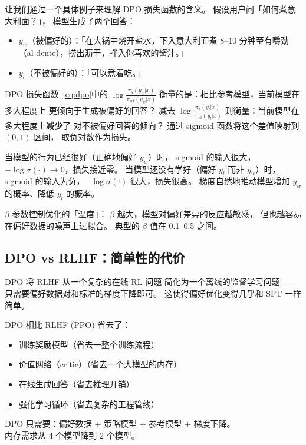 让我们通过一个具体例子来理解 DPO 损失函数的含义。
假设用户问「如何煮意大利面？」，
模型生成了两个回答：
\begin{itemize}[noitemsep]
  \item $y_w$（被偏好的）：「在大锅中烧开盐水，下入意大利面煮 8--10 分钟至有嚼劲（al dente），捞出沥干，拌入你喜欢的酱汁。」
  \item $y_l$（不被偏好的）：「可以煮着吃。」
\end{itemize}

DPO 损失函数~\eqref{eq:dpo}中的
$\log \frac{\pi_\theta(y_w|x)}{\pi_{\mathrm{ref}}(y_w|x)}$
衡量的是：相比参考模型，当前模型在多大程度上
更倾向于生成被偏好的回答？
减去 $\log \frac{\pi_\theta(y_l|x)}{\pi_{\mathrm{ref}}(y_l|x)}$
则衡量：当前模型在多大程度上\textbf{减少}了
对不被偏好回答的倾向？
通过 sigmoid 函数将这个差值映射到 $(0, 1)$ 区间，
取负对数作为损失。

当模型的行为已经很好（正确地偏好 $y_w$）时，
sigmoid 的输入很大，$-\log \sigma(\cdot) \to 0$，损失接近零。
当模型还没有学好（偏好 $y_l$ 而非 $y_w$）时，
sigmoid 的输入为负，$-\log \sigma(\cdot)$ 很大，损失很高。
梯度自然地推动模型增加 $y_w$ 的概率、降低 $y_l$ 的概率。

$\beta$ 参数控制优化的「温度」：
$\beta$ 越大，模型对偏好差异的反应越敏感，
但也越容易在偏好数据的噪声上过拟合。
典型的 $\beta$ 值在 0.1--0.5 之间。

\subsection{DPO vs RLHF：简单性的代价}

DPO 将 RLHF 从一个复杂的在线 RL 问题
简化为一个离线的监督学习问题——
只需要偏好数据对和标准的梯度下降即可。
这使得偏好优化变得几乎和 SFT 一样简单。

\begin{corebox}
DPO 相比 RLHF (PPO) 省去了：
\begin{itemize}[noitemsep]
  \item 训练奖励模型（省去一整个训练流程）
  \item 价值网络（critic）（省去一个大模型的内存）
  \item 在线生成回答（省去推理开销）
  \item 强化学习循环（省去复杂的工程管线）
\end{itemize}
DPO 只需要：偏好数据 + 策略模型 + 参考模型 + 梯度下降。\\
内存需求从 4 个模型降到 2 个模型。
\end{corebox}

